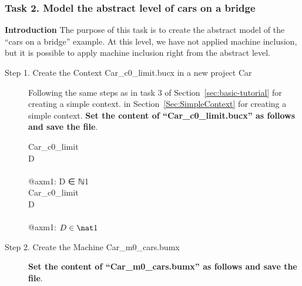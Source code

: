 \subsubsection{Task 2. Model the abstract level of cars on a bridge}
\textbf{Introduction} The purpose of this task is to create the abstract model of the ``cars on a bridge'' example. At this level, we have not applied machine inclusion, but it is possible to apply machine inclusion right from the abstract level. 
\begin{description}
	\item[Step 1. Create the Context Car\_c0\_limit.bucx in a new project Car] 
	Following the same steps as 
	\ifplastex
	in task 3 of Section~\ref{sec:basic-tutorial} for creating a simple context.  
	\else
	in Section~\ref{Sec:SimpleContext} for creating a simple context.
	\fi
	\textbf{Set the content of ``Car\_c0\_limit.bucx'' as follows and save the file}.
	  
	  \begin{center}
		\begin{Bcode}
			\ifplastex
			\Bcontext{} Car\_c0_limit\\
			\Bconstants{} D\\
			\Baxioms\\
			@axm1: D ∈ ℕ1\\
			\Bend
			\else
			\Bcontext{} Car_c0_limit\\
			\Bconstants{} D\\
			\Baxioms\\
			\Btab @axm1: \(D \in \nat1\)\\
			\Bend
			\fi
		\end{Bcode}
	\end{center}
	\item[Step 2. Create the Machine Car\_m0\_cars.bumx]\textbf{Set the content of ``Car\_m0\_cars.bumx'' as follows and save the file}.


\end{description}
